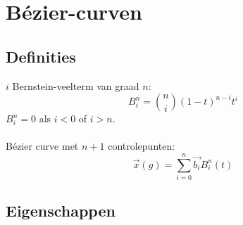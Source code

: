 \documentclass[tmi_notities.tex]{subfiles}
\begin{document}
\chapter{B\'ezier-curven}
\section{Definities}
$i$ Bernstein-veelterm van graad $n$:
\[
B_{i}^{n} = \binom{n}{i}(1-t)^{n-i}t^{i}
\]
$B_{i}^{n} = 0$ als $i < 0$ of $i > n$.\\\\
B\'ezier curve met $n+1$ controlepunten:
\[
\vec{x}(g) = \sum_{i=0}^n\vec{b_{i}}B_{i}^{n}(t)
\]

\section{Eigenschappen}
\end{document}

